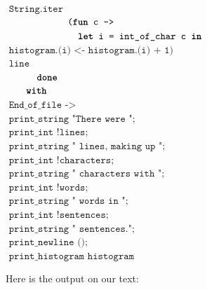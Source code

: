 \documentclass[]{book}
\newcommand{\plet}{\textbf{let}\xspace}
\newcommand{\pin}{\textbf{in}\xspace}
\newcommand{\pwith}{\textbf{with}\xspace}
\newcommand{\pfun}{\textbf{fun}\xspace}
\newcommand{\pdone}{\textbf{done}\xspace}
\newcommand{\smspace}{\vspace{4mm}}
\begin{document}
{\begin{minipage}{\textwidth}
$\texttt{\ \ \ \ \ \ \ \ \ \ String.iter}$\hfill{}\\
$\texttt{\ \ \ \ \ \ \ \ \ \ \ \ (\pfun c ->}$\\
$\texttt{\ \ \ \ \ \ \ \ \ \ \ \ \ \ \plet i = int\_of\_char c \pin}$\\
$\texttt{\ \ \ \ \ \ \ \ \ \ \ \ \ \ \ \ histogram.(i) <- histogram.(i) + 1)}$\hfill{}\\
$\texttt{\ \ \ \ \ \ \ \ \ \ \ \ line}$\\
$\texttt{\ \ \ \ \ \ \pdone}$\\
$\texttt{\ \ \ \ \pwith}$\\
$\texttt{\ \ \ \ \ \ End\_of\_file ->}$\\
$\texttt{\ \ \ \ \ \ \ \ print\_string "There were ";}$\\
$\texttt{\ \ \ \ \ \ \ \ print\_int !lines;}$\\
$\texttt{\ \ \ \ \ \ \ \ print\_string " lines, making up ";}$\\
$\texttt{\ \ \ \ \ \ \ \ print\_int !characters;}$\\
$\texttt{\ \ \ \ \ \ \ \ print\_string " characters with ";}$\\
$\texttt{\ \ \ \ \ \ \ \ print\_int !words;}$\\
$\texttt{\ \ \ \ \ \ \ \ print\_string " words in ";}$\\
$\texttt{\ \ \ \ \ \ \ \ print\_int !sentences;}$\\
$\texttt{\ \ \ \ \ \ \ \ print\_string " sentences.";}$\\
$\texttt{\ \ \ \ \ \ \ \ print\_newline ();}$\\
$\texttt{\ \ \ \ \ \ \ \ print\_histogram histogram}$\hfill{}\vphantom{g}
\end{minipage}}
\smspace

\noindent Here is the output on our text:
\end{document}
